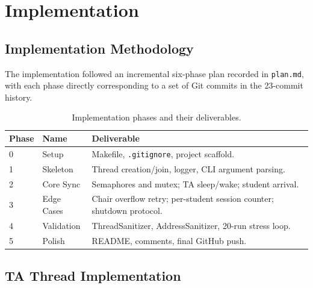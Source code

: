 \documentclass[12pt,a4paper]{report}
\begin{document}
\chapter{Implementation}

\section{Implementation Methodology}

The implementation followed an incremental six-phase plan recorded in \texttt{plan.md}, with
each phase directly corresponding to a set of Git commits in the 23-commit history.

\begin{table}[H]
  \centering\small
  \caption{Implementation phases and their deliverables.}
  \label{tab:phases}
  \begin{tabularx}{\textwidth}{l l X}
    \toprule
    \textbf{Phase} & \textbf{Name} & \textbf{Deliverable} \\
    \midrule
    0 & Setup       & Makefile, \texttt{.gitignore}, project scaffold. \\
    1 & Skeleton    & Thread creation/join, logger, CLI argument parsing. \\
    2 & Core Sync   & Semaphores and mutex; TA sleep/wake; student arrival. \\
    3 & Edge Cases  & Chair overflow retry; per-student session counter; shutdown protocol. \\
    4 & Validation  & ThreadSanitizer, AddressSanitizer, 20-run stress loop. \\
    5 & Polish      & README, comments, final GitHub push. \\
    \bottomrule
  \end{tabularx}
\end{table}

\section{TA Thread Implementation}
\end{document}
